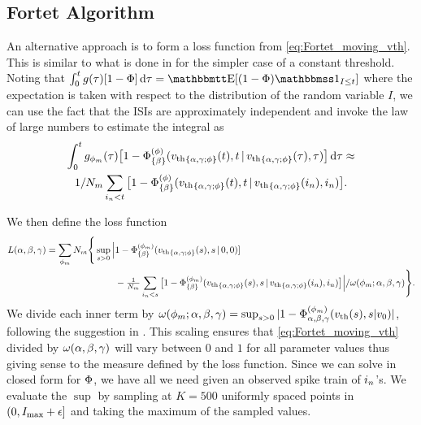 \subsection{Fortet Algorithm}
An alternative approach is to form a loss function from
\cref{eq:Fortet_moving_vth}. This is similar to what is done in
\cite{Ditlevsen2008,Ditlevsen2007} for the simpler case of a constant threshold.
Noting that $\int_0^t g (\t) [1-\F ] \intd{\t} = \Exp[ (1 - \F ) \charf_{I \leq
t} ]$ where the expectation is taken with respect to the distribution of the
random variable $I$, we can use the fact that the ISIs are approximately
independent and invoke the law of large numbers to estimate the integral as
\begin{multline*}
\int_0^t g_{\phi_m}({\tau}) 
\big[1-{\Phi}^{(\phi)}_{\{\beta\}}({ v_{\textrm{th} } }_{\{\alpha,{\gamma };\phi\}}(t),  t \,|\,
{ v_{\textrm{th} } }_{\{\alpha,{\gamma };\phi\}}({\tau}), {\tau}) \big] \, \mathrm{d} {\tau} \approx 
\\
1/N_m \sum_{{ i_n} < t} 
\big[1
- {\Phi}^{(\phi)}_{\{\beta\}}({ v_{\textrm{th} } }_{\{\alpha,{\gamma };\phi\}}(t), t \,|\,
{ v_{\textrm{th} } }_{\{\alpha,{\gamma };\phi\}}({ i_n}),{ i_n} )\big].
\end{multline*}


We then define the loss function
\begin{align}
L(\alpha,\beta,{\gamma }) = 
\sum_{\phi_m} N_m \Bigg\{ 
\sup_{s > 0}
		 \Big|& 1 - {\Phi}^{(\phi_m)}_{\{\beta\}}({ v_{\textrm{th} } }_{\{\alpha,{\gamma };\phi\}}(s), s \,|\,0,0) ] 
		 \notag
\\
		 &-  \tfrac{1}{N_m}\sum_{{ i_n} < s}
		 \big[1 - {\Phi}^{(\phi_m)}_{\{\beta\}}({ v_{\textrm{th} } }_{\{\alpha,{\gamma };\phi\}}(s),s  \,|\,
		 { v_{\textrm{th} } }_{\{\alpha,{\gamma };\phi\}}({ i_n}), { i_n}) \big] \Big| / \omega(\phi_m; \alpha,\beta,{\gamma })
		   \Bigg\}.
\label{eq:loss_function_fortet}
\end{align}
We divide each inner term by $\omega(\phi_m; \alpha,\beta,{\gamma }) =
\sup_{s > 0} |1 - {\Phi}^{(\phi_m)}_{{\alpha,\beta,{\gamma } }}({ v_{\textrm{th} } }(s), s|v_0) |$,
following the suggestion in
\cite{Ditlevsen2007}. This scaling ensures that \cref{eq:Fortet_moving_vth}
divided by $\omega(\alpha,\beta,{\gamma })$ will vary between $0$ and $1$ for all parameter
values thus giving sense to the measure defined by the loss
function. Since we can solve in closed form for ${\Phi}$, we have all we
need given an observed spike train of 
${ i_n}$'s. We evaluate the $\sup$ by sampling at 
$K=500$ uniformly spaced points in $(0, I_{\max} + {\epsilon}]$ and taking the maximum
of the sampled values. 


